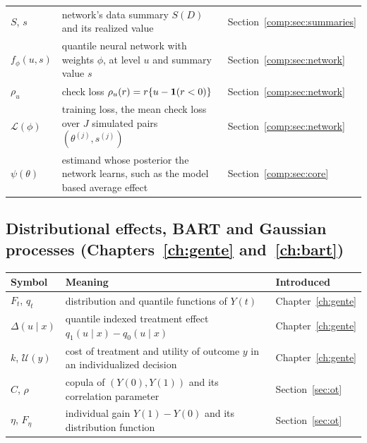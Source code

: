 {\noindent\small\centering
\setlength{\tabcolsep}{4pt}\renewcommand{\arraystretch}{1.1}
\begin{tabular}{>{\raggedright\arraybackslash}p{1.0in}>{\raggedright\arraybackslash}p{2.15in}>{\raggedright\arraybackslash}p{0.95in}}
$S$, $s$ & network's data summary $S(D)$ and its realized value & Section~\ref{comp:sec:summaries} \\
$f_\phi(u, s)$ & quantile neural network with weights $\phi$, at level $u$ and summary value $s$ & Section~\ref{comp:sec:network} \\
$\rho_u$ & check loss $\rho_u(r) = r\{u - \mathbf{1}(r < 0)\}$ & Section~\ref{comp:sec:network} \\
$\mathcal{L}(\phi)$ & training loss, the mean check loss over $J$ simulated pairs $(\theta^{(j)}, s^{(j)})$ & Section~\ref{comp:sec:network} \\
$\psi(\theta)$ & estimand whose posterior the network learns, such as the model based average effect & Section~\ref{comp:sec:core} \\
\bottomrule
\end{tabular}\par}

\subsection*{Distributional effects, BART and Gaussian processes (Chapters~\ref{ch:gente} and~\ref{ch:bart})}

{\noindent\small\centering
\setlength{\tabcolsep}{4pt}\renewcommand{\arraystretch}{1.1}
\begin{tabular}{>{\raggedright\arraybackslash}p{1.0in}>{\raggedright\arraybackslash}p{2.15in}>{\raggedright\arraybackslash}p{0.95in}}
\toprule
Symbol & Meaning & Introduced \\
\midrule
$F_t$, $q_t$ & distribution and quantile functions of $Y(t)$ & Chapter~\ref{ch:gente} \\
$\Delta(u \mid x)$ & quantile indexed treatment effect $q_1(u \mid x) - q_0(u \mid x)$ & Chapter~\ref{ch:gente} \\
$k$, $\mathcal{U}(y)$ & cost of treatment and utility of outcome $y$ in an individualized decision & Chapter~\ref{ch:gente} \\
$C$, $\rho$ & copula of $(Y(0), Y(1))$ and its correlation parameter & Section~\ref{sec:ot} \\
$\eta$, $F_\eta$ & individual gain $Y(1) - Y(0)$ and its distribution function & Section~\ref{sec:ot} \\
\end{tabular}\par}

